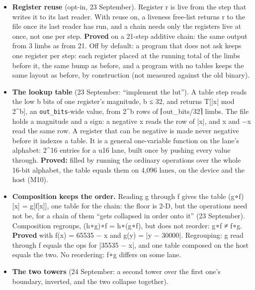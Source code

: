 \begin{itemize}
\begin{itemize}
\begin{itemize}
\item Every output bit is rebuilt from the raw fields one bit at a time, and each sign still holds 64 bits past its written width. This holds on 4,096 lanes in the 64-limb file and 512 in the 256-limb file.
\item Hand-worked answers match.
\item The narrowed widths are exactly the rule's: 32, 20, 20, 32, 41, 41, 32 and 32 over unsigned 32- and 20-bit fields and a signed 40-bit field. All 4,096 lanes equal the oracle past every narrowed width.
\item A wrap below 4 bits is refused at imprint (\texttt{test/\allowbreak{}engine/\allowbreak{}record\_\allowbreak{}bitwise\_\allowbreak{}test}, 24 checks, 0 failed).
\end{itemize}
\end{itemize}
\item \textbf{Register reuse} (opt-in, 23 September). Register r is live from the step that writes it to its last reader. With reuse on, a liveness free-list returns r to the file once its last reader has run, and a chain needs only the registers live at once, not one per step. \textbf{Proved} on a 21-step additive chain: the same output from 3 limbs as from 21. Off by default: a program that does not ask keeps one register per step: each register placed at the running total of the limbs before it, the same bump as before, and a program with no tables keeps the same layout as before, by construction (not measured against the old binary).
\item \textbf{The lookup table} (23 September: “implement the lut”). A table step reads the low b bits of one register's magnitude, b ≤ 32, and returns T[|x| mod 2\textasciicircum{}b], an \texttt{out\_\allowbreak{}bits}-wide value, from 2\textasciicircum{}b rows of ⌈out\_\allowbreak{}bits/32⌉ limbs. The file holds a magnitude and a sign: a negative x reads the row of |x|, and x and −x read the same row. A register that can be negative is made never negative before it indexes a table. It is a general one-variable function on the lane's alphabet: 2\textasciicircum{}16 entries for a u16 lane, built once by pushing every value through. \textbf{Proved:} filled by running the ordinary operations over the whole 16-bit alphabet, the table equals them on 4,096 lanes, on the device and the host (M10).
\item \textbf{Composition keeps the order.} Reading g through f gives the table (g∘f)[x] = g[f[x]], one table for the chain: the floor is 2-D, but the operations need not be, for a chain of them “gets collapsed in order onto it” (23 September). Composition regroups, (h∘g)∘f = h∘(g∘f), but does not reorder: g∘f ≠ f∘g. \textbf{Proved} with f(x) = 65535 − x and g(y) = |y − 30000|. Regrouping: g read through f equals the ops for |35535 − x|, and one table composed on the host equals the two. No reordering: f∘g differs on some lane.
\item \textbf{The two towers} (24 September: a second tower over the first one's boundary, inverted, and the two collapse together).


\end{itemize}
